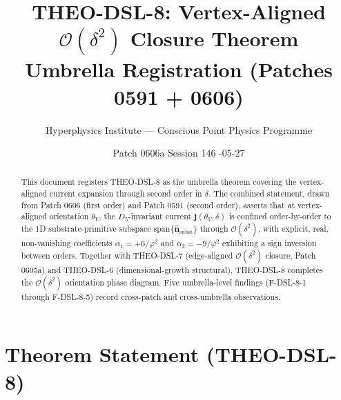 \documentclass[11pt]{article}
\title{THEO-DSL-8: Vertex-Aligned $\mathcal{O}(\delta^2)$ Closure Theorem \\[2pt]
\large Umbrella Registration (Patches 0591 + 0606)}
\author{Hyperphysics Institute --- Conscious Point Physics Programme}
\date{Patch 0606a \quad Session 146 \quad 2026-05-27}
\begin{document}
\maketitle

\begin{abstract}
This document registers THEO-DSL-8 as the umbrella theorem covering the
vertex-aligned current expansion through second order in $\delta$. The
combined statement, drawn from Patch 0606 (first order) and Patch 0591
(second order), asserts that at vertex-aligned orientation $\theta_V$,
the $D_5$-invariant current $\mathbf{j}(\theta_V, \delta)$ is confined
order-by-order to the 1D substrate-primitive subspace
$\mathrm{span}\{\hat{\mathbf{n}}_{\text{subst}}\}$ through
$\mathcal{O}(\delta^2)$, with explicit, real, non-vanishing coefficients
$\alpha_1 = +6/\varphi^2$ and $\alpha_2 = -9/\varphi^2$ exhibiting a sign
inversion between orders. Together with THEO-DSL-7 (edge-aligned
$\mathcal{O}(\delta^2)$ closure, Patch 0605a) and THEO-DSL-6
(dimensional-growth structural), THEO-DSL-8 completes the
$\mathcal{O}(\delta^2)$ orientation phase diagram. Five umbrella-level
findings (F-DSL-8-1 through F-DSL-8-5) record cross-patch and
cross-umbrella observations.
\end{abstract}

\section{Theorem Statement (THEO-DSL-8)}
\end{document}
